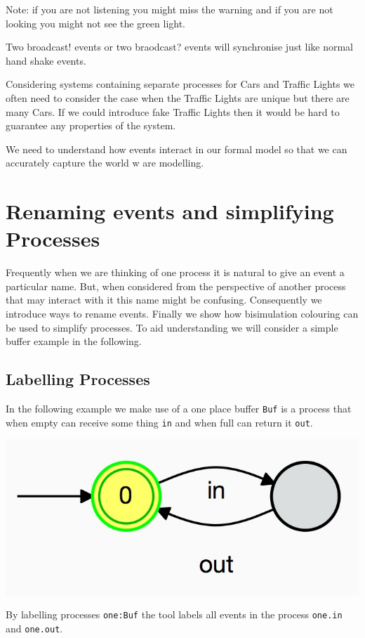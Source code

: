\documentclass[]{article}
\begin{document}
Note: if you are not listening you might miss the warning and if you are not looking you might not see the green light.

Two {\sf broadcast!} events or two {\sf braodcast?} events will synchronise just like normal hand shake events.

Considering systems containing separate processes for  {\sf Cars} and {\sf Traffic Lights} we often need to consider the case when the {\sf Traffic Lights} are unique but there are many {\sf Cars}.  If we could introduce fake {\sf Traffic Lights}  then it would be hard to guarantee any properties of the system.

We need to understand how events interact in our formal model so that we can accurately capture  the world w are modelling.



\section{ Renaming events and simplifying Processes}
Frequently when we are thinking of one process it is natural to give an event a particular name. But, when considered from the perspective of another process that may interact with it this name might be confusing. Consequently we introduce ways to rename events.
Finally we show how bisimulation colouring can be used to simplify processes. To aid understanding we will consider a simple buffer example in the following.
\subsection{Labelling Processes}
In the following example we make use of a one place buffer \verb$Buf$ is a process that when empty can receive some thing \verb$in$ and when full can return it \verb$out$. 
\noindent\begin{center} \includegraphics[scale=0.15]{Buf.jpg} \end{center}
By labelling  processes  \verb$one:Buf$ the tool  labels all events in the process \verb$one.in$ and \verb$one.out$.
\end{document}
